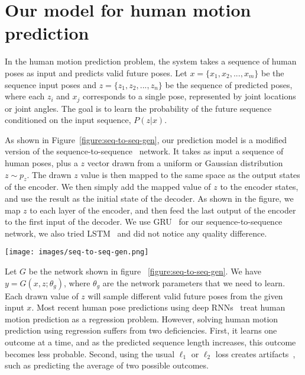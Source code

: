 \documentclass[10pt,twocolumn,letterpaper]{article}
\begin{document}
\section{Our model for human motion prediction}

In the human motion prediction problem, the system takes a sequence of human poses as input and predicts valid future poses. Let $x=\{x_{1},x_{2},...,x_{m}\}$ be the sequence input poses and $z=\{z_{1},z_{2},...,z_{n}\}$ be the sequence of predicted poses, where each $z_{i}$ and $x_{j}$ corresponds to a single pose, represented by joint locations or joint angles. The goal is to learn the probability of the future sequence conditioned on the input sequence, $P(z|x)$.

As shown in Figure~\ref{figure:seq-to-seq-gen}, our prediction model is a modified version of the sequence-to-sequence~\cite{nips2014:Ilya} network. It takes as input a sequence of human poses, plus a $z$ vector drawn from a uniform or Gaussian distribution $z \sim p_{z}$. The drawn $z$ value is then mapped to the same space as the output states of the encoder. We then simply add the mapped value of $z$ to the encoder states, and use the result as the initial state of the decoder. As shown in the figure, we map $z$ to each layer of the encoder, and then feed the last output of the encoder to the first input of the decoder. We use GRU~\cite{corr2014:Chung} for our sequence-to-sequence network, we also tried LSTM~\cite{nc1997:Hochreiter} and did not notice any quality difference.

\begin{figure*}[ht]
\centering
\texttt{[image: images/seq-to-seq-gen.png]}
\caption{Sequence-to-sequence generator network. It predicts multiple future sequences from the same input by feeding in different $z$ values.}
\label{figure:seq-to-seq-gen}
\end{figure*}

Let $G$ be the network shown in figure ~\ref{figure:seq-to-seq-gen}. We have $y = G(x,z;\theta_{g})$, where $\theta_{g}$ are the network parameters that we need to learn. Each drawn value of $z$ will sample different valid future poses from the given input $x$. Most recent human pose predictions using deep RNNs~\cite{iccv2015:Katerina, cvpr2017:julieta} treat human motion prediction as a regression problem. However, solving human motion prediction using regression suffers from two deficiencies. First, it learns one outcome at a time, and as the predicted sequence length increases, this outcome becomes less probable. Second, using the usual $\ell_{1}$ or $\ell_{2}$ loss creates artifacts~\cite{corr2015:Mathieu}, such as predicting the average of two possible outcomes.
\end{document}
